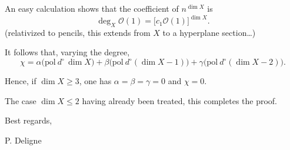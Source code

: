 \documentclass[11pt]{article}
\newcommand{\OO}{\mathcal O}
\begin{document}
An easy calculation shows that the coefficient of \(n^{\dim X}\) is
\[
\deg_X \OO(1)=\bigl[c_1\OO(1)\bigr]^{\dim X}.
\]
(relativized to pencils, this extends from \(X\) to a hyperplane section\ldots)

It follows that, varying the degree,
\[
\chi=\alpha\bigl(\mathrm{pol}\ d^\circ\,\dim X\bigr)
+\beta\bigl(\mathrm{pol}\ d^\circ(\dim X-1)\bigr)
+\gamma\bigl(\mathrm{pol}\ d^\circ(\dim X-2)\bigr).
\]

Hence, if \(\dim X\geq 3\), one has \(\alpha=\beta=\gamma=0\) and \(\chi=0\).

The case \(\dim X\leq 2\) having already been treated, this completes the proof.

\vspace{0.8em}

Best regards,

\hspace{2em}P. Deligne
\end{document}
